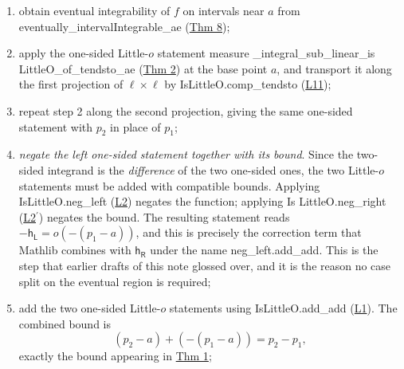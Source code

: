 \documentclass[11pt,reqno]{amsart}
\begin{document}
\begin{enumerate}
\item obtain eventual integrability of $f$ on intervals near $a$ from 
\textsf{eventually\allowbreak\_interval\allowbreak Integrable\allowbreak\_ae}
(\hyperlink{thm:evII}{Thm 8});

\item apply the one-sided Little-$o$ statement \textsf{measure\allowbreak%
\_integral\allowbreak\_sub\allowbreak\_linear\allowbreak \_is\allowbreak
LittleO\allowbreak\_of\allowbreak\_tendsto\allowbreak\_ae} (\hyperlink{thm:linear}%
{Thm 2}) at the base point $a$, and transport it along the first projection
of $\ell\times\ell$ by \textsf{Is\allowbreak LittleO.comp\allowbreak\_tendsto%
} (\hyperlink{lem:compTendsto}{L11});

\item repeat step 2 along the second projection, giving the same one-sided
statement with $p_{2}$ in place of $p_{1}$;

\item \emph{negate the left one-sided statement together with its bound}.
Since the two-sided integrand is the \emph{difference} of the two one-sided
ones, the two Little-$o$ statements must be added with compatible bounds.
Applying \textsf{Is\allowbreak LittleO.neg\allowbreak \_left} (\hyperlink{lem:negleft}%
{L2}) negates the function; applying \textsf{Is\allowbreak
LittleO.neg\allowbreak\_right} (\hyperlink{lem:negright}{L2$^{\prime }$})
negates the bound. The resulting statement reads $-\mathsf{h}_{\mathsf{L}%
}=o(-(p_{1}-a))$, and this is precisely the correction term that Mathlib
combines with $\mathsf{h}_{\mathsf{R}}$ under the name \textsf{%
neg\allowbreak\_left.add\allowbreak\_add}. This is the step that earlier
drafts of this note glossed over, and it is the reason no case split on the
eventual region is required;


\item add the two one-sided Little-$o$ statements using \textsf{%
Is\allowbreak LittleO.add\allowbreak\_add} (\hyperlink{lem:addadd}{L1}). The
combined bound is 
\begin{equation}  \label{eq:combined-bound}
(p_{2}-a)+(-(p_{1}-a))=p_{2}-p_{1},
\end{equation}
exactly the bound appearing in \hyperlink{thm:root}{Thm 1};


\end{enumerate}
\end{document}
